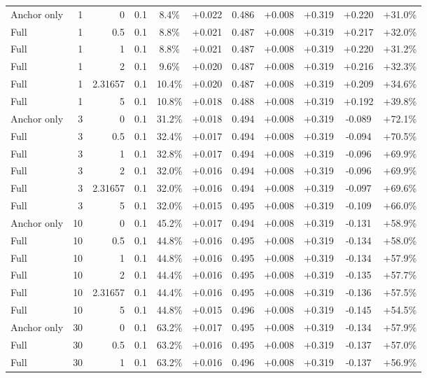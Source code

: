 \begin{table}[htbp]
\begin{tabular}{lrrrccccccc}
Anchor only & 1 & 0 & 0.1 & 8.4\% & +0.022 & 0.486 & +0.008 & +0.319 & +0.220 & +31.0\% \\
Full & 1 & 0.5 & 0.1 & 8.8\% & +0.021 & 0.487 & +0.008 & +0.319 & +0.217 & +32.0\% \\
Full & 1 & 1 & 0.1 & 8.8\% & +0.021 & 0.487 & +0.008 & +0.319 & +0.220 & +31.2\% \\
Full & 1 & 2 & 0.1 & 9.6\% & +0.020 & 0.487 & +0.008 & +0.319 & +0.216 & +32.3\% \\
Full & 1 & 2.31657 & 0.1 & 10.4\% & +0.020 & 0.487 & +0.008 & +0.319 & +0.209 & +34.6\% \\
Full & 1 & 5 & 0.1 & 10.8\% & +0.018 & 0.488 & +0.008 & +0.319 & +0.192 & +39.8\% \\
Anchor only & 3 & 0 & 0.1 & 31.2\% & +0.018 & 0.494 & +0.008 & +0.319 & -0.089 & +72.1\% \\
Full & 3 & 0.5 & 0.1 & 32.4\% & +0.017 & 0.494 & +0.008 & +0.319 & -0.094 & +70.5\% \\
Full & 3 & 1 & 0.1 & 32.8\% & +0.017 & 0.494 & +0.008 & +0.319 & -0.096 & +69.9\% \\
Full & 3 & 2 & 0.1 & 32.0\% & +0.016 & 0.494 & +0.008 & +0.319 & -0.096 & +69.9\% \\
Full & 3 & 2.31657 & 0.1 & 32.0\% & +0.016 & 0.494 & +0.008 & +0.319 & -0.097 & +69.6\% \\
Full & 3 & 5 & 0.1 & 32.0\% & +0.015 & 0.495 & +0.008 & +0.319 & -0.109 & +66.0\% \\
Anchor only & 10 & 0 & 0.1 & 45.2\% & +0.017 & 0.494 & +0.008 & +0.319 & -0.131 & +58.9\% \\
Full & 10 & 0.5 & 0.1 & 44.8\% & +0.016 & 0.495 & +0.008 & +0.319 & -0.134 & +58.0\% \\
Full & 10 & 1 & 0.1 & 44.8\% & +0.016 & 0.495 & +0.008 & +0.319 & -0.134 & +57.9\% \\
Full & 10 & 2 & 0.1 & 44.4\% & +0.016 & 0.495 & +0.008 & +0.319 & -0.135 & +57.7\% \\
Full & 10 & 2.31657 & 0.1 & 44.4\% & +0.016 & 0.495 & +0.008 & +0.319 & -0.136 & +57.5\% \\
Full & 10 & 5 & 0.1 & 44.8\% & +0.015 & 0.496 & +0.008 & +0.319 & -0.145 & +54.5\% \\
Anchor only & 30 & 0 & 0.1 & 63.2\% & +0.017 & 0.495 & +0.008 & +0.319 & -0.134 & +57.9\% \\
Full & 30 & 0.5 & 0.1 & 63.2\% & +0.016 & 0.495 & +0.008 & +0.319 & -0.137 & +57.0\% \\
Full & 30 & 1 & 0.1 & 63.2\% & +0.016 & 0.496 & +0.008 & +0.319 & -0.137 & +56.9\% \\

\end{tabular}
\end{table}
